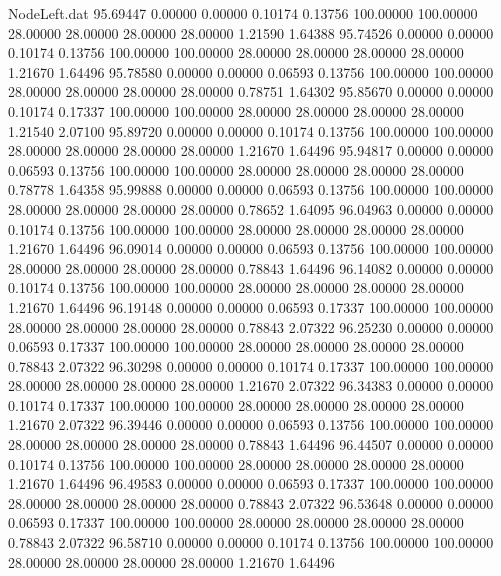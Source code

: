 \begin{filecontents}{NodeLeft.dat}
  95.69447    0.00000    0.00000     0.10174    0.13756  100.00000  100.00000   28.00000   28.00000   28.00000   28.00000    1.21590    1.64388
  95.74526    0.00000    0.00000     0.10174    0.13756  100.00000  100.00000   28.00000   28.00000   28.00000   28.00000    1.21670    1.64496
  95.78580    0.00000    0.00000     0.06593    0.13756  100.00000  100.00000   28.00000   28.00000   28.00000   28.00000    0.78751    1.64302
  95.85670    0.00000    0.00000     0.10174    0.17337  100.00000  100.00000   28.00000   28.00000   28.00000   28.00000    1.21540    2.07100
  95.89720    0.00000    0.00000     0.10174    0.13756  100.00000  100.00000   28.00000   28.00000   28.00000   28.00000    1.21670    1.64496
  95.94817    0.00000    0.00000     0.06593    0.13756  100.00000  100.00000   28.00000   28.00000   28.00000   28.00000    0.78778    1.64358
  95.99888    0.00000    0.00000     0.06593    0.13756  100.00000  100.00000   28.00000   28.00000   28.00000   28.00000    0.78652    1.64095
  96.04963    0.00000    0.00000     0.10174    0.13756  100.00000  100.00000   28.00000   28.00000   28.00000   28.00000    1.21670    1.64496
  96.09014    0.00000    0.00000     0.06593    0.13756  100.00000  100.00000   28.00000   28.00000   28.00000   28.00000    0.78843    1.64496
  96.14082    0.00000    0.00000     0.10174    0.13756  100.00000  100.00000   28.00000   28.00000   28.00000   28.00000    1.21670    1.64496
  96.19148    0.00000    0.00000     0.06593    0.17337  100.00000  100.00000   28.00000   28.00000   28.00000   28.00000    0.78843    2.07322
  96.25230    0.00000    0.00000     0.06593    0.17337  100.00000  100.00000   28.00000   28.00000   28.00000   28.00000    0.78843    2.07322
  96.30298    0.00000    0.00000     0.10174    0.17337  100.00000  100.00000   28.00000   28.00000   28.00000   28.00000    1.21670    2.07322
  96.34383    0.00000    0.00000     0.10174    0.17337  100.00000  100.00000   28.00000   28.00000   28.00000   28.00000    1.21670    2.07322
  96.39446    0.00000    0.00000     0.06593    0.13756  100.00000  100.00000   28.00000   28.00000   28.00000   28.00000    0.78843    1.64496
  96.44507    0.00000    0.00000     0.10174    0.13756  100.00000  100.00000   28.00000   28.00000   28.00000   28.00000    1.21670    1.64496
  96.49583    0.00000    0.00000     0.06593    0.17337  100.00000  100.00000   28.00000   28.00000   28.00000   28.00000    0.78843    2.07322
  96.53648    0.00000    0.00000     0.06593    0.17337  100.00000  100.00000   28.00000   28.00000   28.00000   28.00000    0.78843    2.07322
  96.58710    0.00000    0.00000     0.10174    0.13756  100.00000  100.00000   28.00000   28.00000   28.00000   28.00000    1.21670    1.64496

\end{filecontents}
